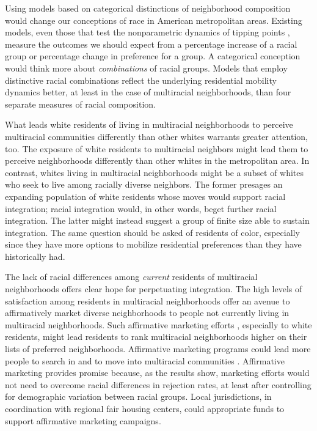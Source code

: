 \documentclass{baderart}
\begin{document}
Using models based on categorical distinctions of neighborhood composition would change our conceptions of race in American metropolitan areas. Existing models, even those that test the nonparametric dynamics of tipping points \citep[e.g.,][]{schelling_dynamic_1971, bruch_neighborhood_2006, xie_modeling_2012}, measure the outcomes we should expect from a percentage increase of a racial group or percentage change in preference for a group. A categorical conception would think more about \emph{combinations} of racial groups. Models that employ distinctive racial combinations reflect the underlying residential mobility dynamics better, at least in the case of multiracial neighborhoods, than four separate measures of racial composition. 

What leads white residents of living in multiracial neighborhoods to perceive multiracial communities differently than other whites warrants greater attention, too. The exposure of white residents to multiracial neighbors might lead them to perceive neighborhoods differently than other whites in the metropolitan area. In contrast, whites living in multiracial neighborhoods might be a subset of whites who seek to live among racially diverse neighbors. The former presages an expanding population of white residents whose moves would support racial integration; racial integration would, in other words, beget further racial integration. The latter might instead suggest a group of finite size able to sustain integration. The same question should be asked of residents of color, especially since they have more options to mobilize residential preferences than they have historically had. 

The lack of racial differences among \emph{current} residents of multiracial neighborhoods offers clear hope for perpetuating integration. The high levels of satisfaction among residents in multiracial neighborhoods offer an avenue to affirmatively market diverse neighborhoods to people not currently living in multiracial neighborhoods. Such affirmative marketing efforts \citep{haberle_accessing_2012}, especially to white residents, might lead residents to rank multiracial neighborhoods higher on their lists of preferred neighborhoods. Affirmative marketing programs could lead more people to search in and to move into multiracial communities \citep{krysan_cycle_2017}. Affirmative marketing provides promise because, as the results show, marketing efforts would not need to overcome racial differences in rejection rates, at least after controlling for demographic variation between racial groups. Local jurisdictions, in coordination with regional fair housing centers, could appropriate funds to support affirmative marketing campaigns. 
\end{document}
